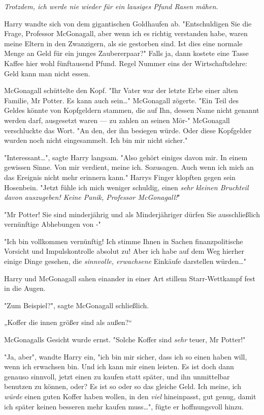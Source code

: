 {\emph{Trotzdem, ich werde nie wieder für ein lausiges Pfund Rasen mähen.}

Harry wandte sich von dem gigantischen Goldhaufen ab. "Entschuldigen Sie die Frage, Professor McGonagall, aber wenn ich es richtig verstanden habe, waren meine Eltern in den Zwanzigern, als sie gestorben sind. Ist dies eine normale Menge an Geld für ein junges Zaubererpaar?" Falls ja, dann kostete eine Tasse Kaffee hier wohl fünftausend Pfund. Regel Nummer eins der Wirtschaftslehre: Geld kann man nicht essen.

McGonagall schüttelte den Kopf. "Ihr Vater war der letzte Erbe einer alten Familie, Mr Potter. Es kann auch sein…" McGonagall zögerte. "Ein Teil des Geldes könnte von Kopfgeldern stammen, die auf Ihn, dessen Name nicht genannt werden darf, ausgesetzt waren --- zu zahlen an seinen Mör-" McGonagall verschluckte das Wort. "An den, der ihn besiegen würde. Oder diese Kopfgelder wurden noch nicht eingesammelt. Ich bin mir nicht sicher."

"Interessant…", sagte Harry langsam. "Also gehört einiges davon mir. In einem gewissen Sinne. Von mir verdient, meine ich. Sozusagen. Auch wenn ich mich an das Ereignis nicht mehr erinnern kann." Harrys Finger klopften gegen sein Hosenbein. "Jetzt fühle ich mich weniger schuldig, einen \emph{sehr kleinen Bruchteil davon auszugeben! Keine Panik, Professor McGonagall!}"

"Mr Potter! Sie sind minderjährig und als Minderjähriger dürfen Sie ausschließlich vernünftige Abhebungen von -"

"Ich bin vollkommen vernünftig! Ich stimme Ihnen in Sachen finanzpolitische Vorsicht und Impulskontrolle absolut zu! Aber ich habe auf dem Weg hierher einige Dinge gesehen, die \emph{sinnvolle, erwachsene} Einkäufe darstellen würden…"

Harry und McGonagall sahen einander in einer Art stillem Starr-Wettkampf fest in die Augen.

"Zum Beispiel?", sagte McGonagall schließlich.

„Koffer die innen größer sind als außen?“

McGonagalls Gesicht wurde ernst. "Solche Koffer sind \emph{sehr} teuer, Mr Potter!"

"Ja, aber", wandte Harry ein, "ich bin mir sicher, dass ich so einen haben will, wenn ich erwachsen bin. Und ich kann mir einen leisten. Es ist doch dann genauso sinnvoll, jetzt einen zu kaufen statt später, und ihn unmittelbar benutzen zu können, oder? Es ist so oder so das gleiche Geld. Ich meine, ich \emph{würde} einen guten Koffer haben wollen, in den \emph{viel} hineinpasst, gut genug, damit ich später keinen besseren mehr kaufen muss…", fügte er hoffnungsvoll hinzu.

}

